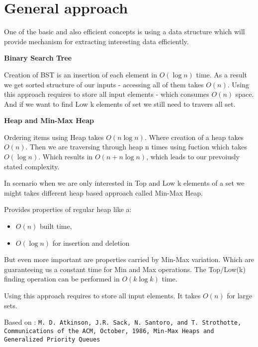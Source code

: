 \section*{General approach}
One of the basic and also efficient concepts is using a data structure which
will provide mechanism for extracting interesting data efficiently. 

\noindent \textbf{Binary Search Tree}

Creation of BST is an insertion of each element in $O(\log{}n)$ time. As a result 
we get sorted structure of our inputs - accessing all of them takes $O(n)$.
Using this approach requires to store all input elements - which consumes $O(n)$ space. 
And if we want to find Low k elements of set we still need to travers all set.

\noindent \textbf{Heap and Min-Max Heap}

Ordering items using Heap takes $O(n\log{}n)$. Where creation of a heap takes
$O(n)$. Then we are traversing through heap n times using fuction which takes
$O(\log{}n)$. Which results in $O(n + n\log{}n)$, which leads to our prevoiusly
stated complexity.

In scenario when we are only interested in Top and Low k elements of a set we might takes
different heap based approach called Min-Max Heap.

Provides properties of regular heap like a: 
\begin{itemize}
\item $O(n)$ built time,
\item $O(\log{}n)$ for insertion and deletion
\end{itemize}

But even more important are properties carried by Min-Max variation. Which are 
guaranteeing us a constant time for Min and Max operations. The Top/Low(k) 
finding operation can be performed in $O(k\log{}k)$ time.

Using this approach requires to store all input elements. It takes $O(n)$ for 
large sets.

Based on : \texttt{M. D. Atkinson, J.R. Sack, N. Santoro, and T. Strothotte, 
Communications of the ACM, 
October, 1986, 
Min-Max Heaps and Generalized Priority Queues}
